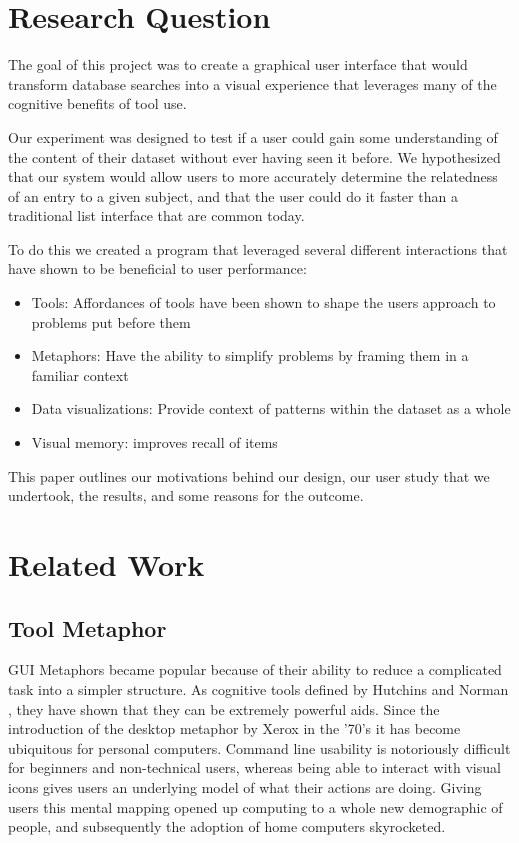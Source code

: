 \documentclass{article}
\begin{document}
\section{Research Question}

The goal of this project was to create a graphical user interface that would transform database searches into a visual experience that leverages many of the cognitive benefits of tool use.

Our experiment was designed to test if a user could gain some understanding of the content of their dataset without ever having seen it before.  We hypothesized that our system would allow users to more accurately determine the relatedness of an entry to a given subject, and that the user could do it faster than a traditional list interface that are common today.  

To do this we created a program that leveraged several different interactions that have shown to be beneficial to user performance:
\begin{itemize}
\item{Tools: Affordances of tools have been shown to shape the users approach to problems put before them}
\item{Metaphors: Have the ability to simplify problems by framing them in a familiar context}
\item{Data visualizations: Provide context of patterns within the dataset as a whole}
\item{Visual memory: improves recall of items}
\end{itemize}


This paper outlines our motivations behind our design, our user study that we undertook, the results, and some reasons for the outcome. 
\section{Related Work} 
\subsection{Tool Metaphor}

GUI Metaphors became popular because of their ability to reduce a complicated task into a simpler structure.  As cognitive tools defined by Hutchins \cite{Hutchins1995} and Norman \cite{Norman1991}, they have shown that they can be extremely powerful aids.  Since the introduction of the desktop metaphor by Xerox in the '70's  it has become ubiquitous for personal computers.  Command line usability is notoriously difficult for beginners and non-technical users, whereas being able to interact with visual icons gives users an underlying model of what their actions are doing.  Giving users this mental mapping opened up computing to a whole new demographic of people, and subsequently the adoption of home computers skyrocketed.  
\end{document}
